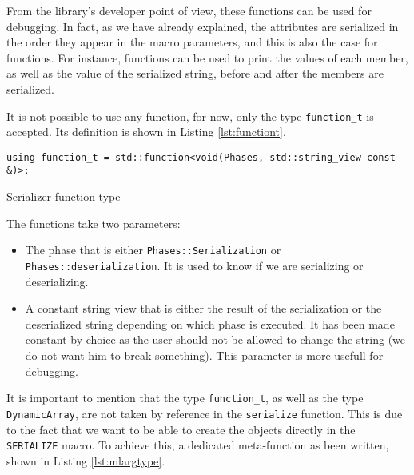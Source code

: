 From the library's developer point of view, these functions can be used for
debugging. In fact, as we have already explained, the attributes are serialized
in the order they appear in the macro parameters, and this is also the case for
functions. For instance, functions can be used to print the values of each
member, as well as the value of the serialized string, before and after the
members are serialized.

It is not possible to use any function, for now, only the type
\texttt{function\_t} is accepted. Its definition is shown in Listing
\ref{lst:functiont}.

\begin{listing}[ht!]
\begin{verbatim}
using function_t = std::function<void(Phases, std::string_view const &)>;
\end{verbatim}
\caption{Serializer function type}
\label{lst:functiont}
\end{listing}

The functions take two parameters:

\begin{itemize}
  \item The phase that is either \texttt{Phases::Serialization} or
    \texttt{Phases::deserialization}. It is used to know if we are serializing
    or deserializing.
  \item A constant string view that is either the result of the serialization or
    the deserialized string depending on which phase is executed. It has been
    made constant by choice as the user should not be allowed to change the
    string (we do not want him to break something). This parameter is more
    usefull for debugging.
\end{itemize}

It is important to mention that the type \texttt{function\_t}, as well as the
type \texttt{DynamicArray}, are not taken by reference in the \texttt{serialize}
function. This is due to the fact that we want to be able to create the objects
directly in the \texttt{SERIALIZE} macro. To achieve this, a dedicated
meta-function as been written, shown in Listing \ref{lst:mlargtype}.

